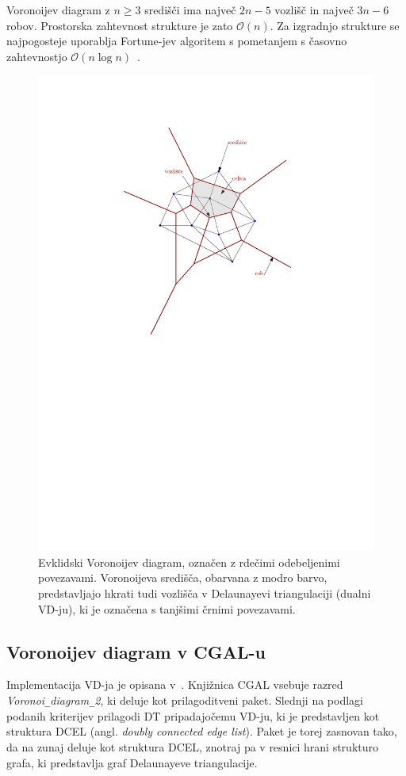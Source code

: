 \documentclass[a4paper, 12pt]{book}
\newcommand{\OO}{\ensuremath{\mathcal{O}}} %
\newcommand{\U}{\texttt{\_}}
\begin{document}
Voronoijev diagram z $n\geq 3$ središči ima največ $2n - 5$ vozlišč in največ $3n-6$ robov. Prostorska zahtevnost strukture je zato $\OO(n)$. Za izgradnjo strukture se najpogosteje uporablja Fortune-jev algoritem s pometanjem s časovno zahtevnostjo $\OO(n\log n)$~\cite[poglavji 7.1 in 7.2]{bkos-08-all}.

\begin{figure}[htp]
\centerline{\includegraphics[scale=0.8]{pics/voronoi-dt3.pdf}}
\caption{Evklidski Voronoijev diagram, označen z rdečimi odebeljenimi povezavami. Voronoijeva središča, obarvana z modro barvo, predstavljajo hkrati tudi vozlišča v Delaunayevi triangulaciji (dualni VD-ju), ki je označena s tanjšimi črnimi povezavami.}
\label{vd}
\end{figure}

\subsection{Voronoijev diagram v CGAL-u}
Implementacija VD-ja je opisana v~\cite{cgal:k-vda2-15a}. Knjižnica CGAL vsebuje razred \textit{Voronoi\U diagram\U 2}, ki deluje kot prilagoditveni paket. Slednji na podlagi podanih kriterijev prilagodi DT pripadajočemu VD-ju, ki je predstavljen kot struktura DCEL (angl. \textit{doubly connected edge list}). Paket je torej zasnovan tako, da na zunaj deluje kot struktura DCEL, znotraj pa v resnici hrani strukturo grafa, ki predstavlja graf Delaunayeve triangulacije.
\end{document}

